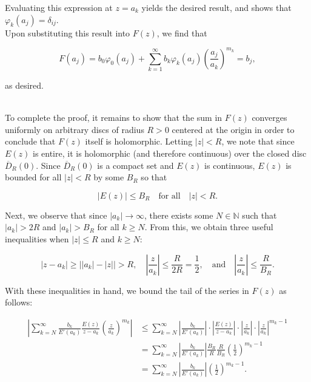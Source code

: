 \begin{solution}
    Evaluating this expression at $z = a_k$ yields the desired result, and shows that $\varphi_k(a_j) = \delta_{ij}$.     \ \\

    Upon substituting this result into $F(z)$, we find that

    $$
    F(a_j) = b_0 \varphi_0(a_j) + \sum_{k=1}^{\infty} b_k \varphi_k(a_j) \left(\frac{a_j}{a_k}\right)^{m_k} = b_j,
    $$

    as desired. 
   
    \ \\
    To complete the proof, it remains to show that the sum in $F(z)$ converges uniformly on arbitrary discs of radius 
    $R > 0$ centered at the origin in order to conclude that $F(z)$ itself is holomorphic. Letting $|z| < R$, we note 
    that since $E(z)$ is entire, it is holomorphic (and therefore continuous) over the closed disc $\overline{D}_R(0)$. 
    Since $\overline{D}_R(0)$ is a compact set and $E(z)$ is continuous, $E(z)$ is bounded for all $|z| < R$ by some 
    $B_R$ so that

    $$
    |E(z)| \leq B_R \quad \text{for all} \quad |z| < R.
    $$

    Next, we observe that since $|a_k| \to \infty$, there exists some $N \in \mathbb{N}$ such that $|a_k| > 2 R$ and 
    $|a_k| > B_R$ for all $k \ge N$. From this, we obtain three useful inequalities when $|z| \le R$ and $k \ge N$:

    $$
    |z - a_k| \ge \Big| |a_k| - |z| \Big| > R, \quad 
      \left| \frac{z}{a_k} \right| \le \frac{R}{2 R} = \frac{1}{2}, \quad
      \text{and} \quad \left| \frac{z}{a_k} \right| \le \frac{R}{B_R}.
    $$

    With these inequalities in hand, we bound the tail of the series in $F(z)$ as follows:

    \begin{align*}
      \left| \sum_{k=N}^{\infty} \frac{b_k}{E'(a_k)} \frac{E(z)}{z - a_k} \left(\frac{z}{a_k} \right)^{m_k} \right|
             &\le \sum_{k=N}^{\infty} \left| \frac{b_k}{E'(a_k)} \right| \cdot  
                                      \left| \frac{E(z)}{z - a_k} \right| \cdot 
                                      \left| \frac{z}{a_k} \right| \cdot 
                                      \left|\frac{z}{a_k} \right|^{m_k - 1} \\
             &= \sum_{k=N}^{\infty} \left| \frac{b_k}{E'(a_k)} \right| \frac{B_R}{R} \frac{R}{B_R}
                                    \left(\frac{1}{2} \right)^{m_k - 1} \\
             &= \sum_{k=N}^{\infty} \left| \frac{b_k}{E'(a_k)} \right| \left(\frac{1}{2} \right)^{m_k - 1}.
    \end{align*}


\end{solution}
